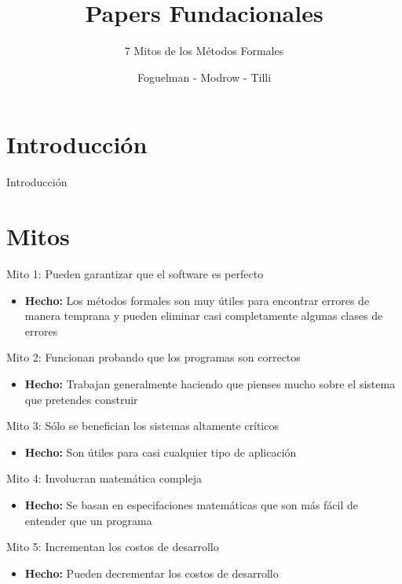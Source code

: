 \documentclass{beamer}
\title{Papers Fundacionales}
\subtitle{7 Mitos de los Métodos Formales}
\author{Foguelman - Modrow - Tilli}
\institute{DC - UBA}
\begin{document}
\frame{\titlepage}
\section{Introducci\'on}
\begin{frame}{Introducci\'on}

\end{frame}

\section{Mitos}
\begin{frame}{Mito 1: Pueden garantizar que el software es perfecto }
\begin{itemize}[<+->]
\item \textbf{Hecho:} Los m\'etodos formales son muy \'utiles para encontrar errores de manera temprana y pueden eliminar casi completamente algunas clases de errores
\end{itemize}
\end{frame}

\begin{frame}{Mito 2: Funcionan probando que los programas son correctos}
\begin{itemize}[<+->]
\item \textbf{Hecho:} Trabajan generalmente haciendo que pienses mucho sobre el sistema que pretendes construir
\end{itemize}
\end{frame}
 
\begin{frame}{Mito 3: S\'olo se benefician los sistemas altamente cr\'iticos} 
\begin{itemize}[<+->]
\item \textbf{Hecho:} Son \'utiles para casi cualquier tipo de aplicaci\'on
\end{itemize}
\end{frame}
 
\begin{frame}{Mito 4: Involucran matem\'atica compleja}
\begin{itemize}[<+->]
\item \textbf{Hecho:} Se basan en especifaciones matem\'aticas que son m\'as f\'acil de entender que un programa
\end{itemize}
\end{frame}
 
\begin{frame}{Mito 5: Incrementan los costos de desarrollo}
\begin{itemize}[<+->]
\item \textbf{Hecho:} Pueden decrementar los costos de desarrollo
\end{itemize}
\end{frame}
 
\end{document}
